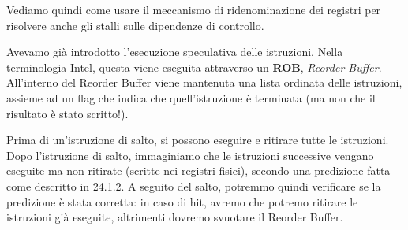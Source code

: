 \documentclass[a4paper,11pt]{article}
\begin{document}
Vediamo quindi come usare il meccanismo di ridenominazione dei registri per risolvere anche gli stalli sulle dipendenze di controllo.

Avevamo già introdotto l'esecuzione speculativa delle istruzioni.
Nella terminologia Intel, questa viene eseguita attraverso un \textbf{ROB}, \textit{Reorder Buffer}.
All'interno del Reorder Buffer viene mantenuta una lista ordinata delle istruzioni, assieme ad un flag che indica che quell'istruzione è terminata (ma non che il risultato è stato scritto!).

Prima di un'istruzione di salto, si possono eseguire e ritirare tutte le istruzioni.
Dopo l'istruzione di salto, immaginiamo che le istruzioni successive vengano eseguite ma non ritirate (scritte nei registri fisici), secondo una predizione fatta come descritto in 24.1.2.
A seguito del salto, potremmo quindi verificare se la predizione è stata corretta: in caso di hit, avremo che potremo ritirare le istruzioni già eseguite, altrimenti dovremo svuotare il Reorder Buffer.
\end{document}
